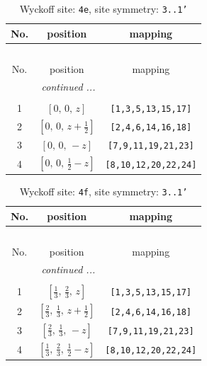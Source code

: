 \documentclass[fleqn,8pt]{jsarticle}
\begin{document}
\begin{longtable}{ccc}
\caption{Wyckoff site: {\tt 4e}, site symmetry: {\tt 3..1'}}
 \\
 \hline \hline
No. & position & mapping \\ \hline \endfirsthead

\multicolumn{2}{l}{\tablename\ \thetable{}} \\
 \hline \hline
No. & position & mapping \\ \hline \endhead

 \hline \hline
\multicolumn{2}{r}{\footnotesize\it continued ...} \\ \endfoot

 \hline \hline
\multicolumn{2}{r}{} \\ \endlastfoot

1 & $\left[ 0,\, 0,\, z \right]$ & {\tt [1,3,5,13,15,17]} \\ \hline
2 & $\left[ 0,\, 0,\, z + \frac{1}{2} \right]$ & {\tt [2,4,6,14,16,18]} \\ \hline
3 & $\left[ 0,\, 0,\, - z \right]$ & {\tt [7,9,11,19,21,23]} \\ \hline
4 & $\left[ 0,\, 0,\, \frac{1}{2} - z \right]$ & {\tt [8,10,12,20,22,24]} \\
\end{longtable}
\renewcommand{\arraystretch}{1.2}
\begin{longtable}{ccc}
\caption{Wyckoff site: {\tt 4f}, site symmetry: {\tt 3..1'}}
 \\
 \hline \hline
No. & position & mapping \\ \hline \endfirsthead

\multicolumn{2}{l}{\tablename\ \thetable{}} \\
 \hline \hline
No. & position & mapping \\ \hline \endhead

 \hline \hline
\multicolumn{2}{r}{\footnotesize\it continued ...} \\ \endfoot

 \hline \hline
\multicolumn{2}{r}{} \\ \endlastfoot

1 & $\left[ \frac{1}{3},\, \frac{2}{3},\, z \right]$ & {\tt [1,3,5,13,15,17]} \\ \hline
2 & $\left[ \frac{2}{3},\, \frac{1}{3},\, z + \frac{1}{2} \right]$ & {\tt [2,4,6,14,16,18]} \\ \hline
3 & $\left[ \frac{2}{3},\, \frac{1}{3},\, - z \right]$ & {\tt [7,9,11,19,21,23]} \\ \hline
4 & $\left[ \frac{1}{3},\, \frac{2}{3},\, \frac{1}{2} - z \right]$ & {\tt [8,10,12,20,22,24]} \\
\end{longtable}
\end{document}

